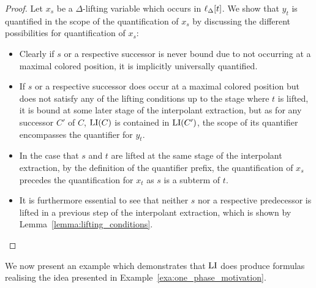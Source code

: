 \begin{proof}
	Let $x_s$ be a $\Delta$-lifting variable which occurs in $\ell_{\Delta}[t]$. 
	We show that $y_t$ is quantified in the scope of the quantification of $x_s$ by discussing the different possibilities for quantification of $x_s$:

	\begin{itemize}
		\item
			Clearly if $s$ or a respective successor is never bound due to not occurring at a maximal colored position, it is implicitly universally quantified.

		\item
			If $s$ or a respective successor does occur at a maximal colored position but does not satisfy any of the lifting conditions up to the stage where $t$ is lifted, it is bound at some later stage of the interpolant extraction, but as for any successor $C'$ of $C$, $\operatorname{LI}(C)$ is contained in $\operatorname{LI}(C')$, 
			the scope of its quantifier encompasses the quantifier for $y_t$.

		\item
			In the case that $s$ and $t$ are lifted at the same stage of the interpolant extraction, by the definition of the quantifier prefix, the quantification of $x_s$ precedes the quantification for $x_t$ as $s$ is a subterm of $t$.


		\item
			It is furthermore essential to see that neither $s$ nor a respective predecessor is lifted in a previous step of the interpolant extraction, which is shown by Lemma~\ref{lemma:lifting_conditions}.
			\qedhere
	\end{itemize}
\end{proof}

We now present an example which demonstrates that $\operatorname{LI}$ does produce formulas realising the idea presented in Example~\ref{exa:one_phase_motivation}.

